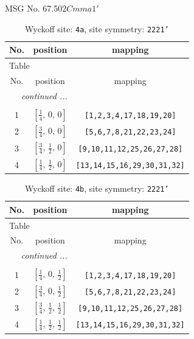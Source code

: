 \documentclass[fleqn,8pt]{jsarticle}
\begin{document}
\setcounter{MaxMatrixCols}{32}

\renewcommand{\tablename}{Table~}
\renewcommand{\figurename}{Figure~}
\begin{center}
\LARGE
MSG No. 67.502\quad$Cmma1'$
\end{center}
\renewcommand{\arraystretch}{1.2}
\begin{longtable}{ccc}
\caption{Wyckoff site: {\tt 4a}, site symmetry: {\tt 2221'}}
 \\
 \hline \hline
No. & position & mapping \\ \hline \endfirsthead

\multicolumn{2}{l}{\tablename\ \thetable{}} \\
 \hline \hline
No. & position & mapping \\ \hline \endhead

 \hline \hline
\multicolumn{2}{r}{\footnotesize\it continued ...} \\ \endfoot

 \hline \hline
\multicolumn{2}{r}{} \\ \endlastfoot

1 & $\left[ \frac{1}{4},\, 0,\, 0 \right]$ & {\tt [1,2,3,4,17,18,19,20]} \\ \hline
2 & $\left[ \frac{3}{4},\, 0,\, 0 \right]$ & {\tt [5,6,7,8,21,22,23,24]} \\ \hline
3 & $\left[ \frac{3}{4},\, \frac{1}{2},\, 0 \right]$ & {\tt [9,10,11,12,25,26,27,28]} \\ \hline
4 & $\left[ \frac{1}{4},\, \frac{1}{2},\, 0 \right]$ & {\tt [13,14,15,16,29,30,31,32]} \\
\end{longtable}
\renewcommand{\arraystretch}{1.2}
\begin{longtable}{ccc}
\caption{Wyckoff site: {\tt 4b}, site symmetry: {\tt 2221'}}
 \\
 \hline \hline
No. & position & mapping \\ \hline \endfirsthead

\multicolumn{2}{l}{\tablename\ \thetable{}} \\
 \hline \hline
No. & position & mapping \\ \hline \endhead

 \hline \hline
\multicolumn{2}{r}{\footnotesize\it continued ...} \\ \endfoot

 \hline \hline
\multicolumn{2}{r}{} \\ \endlastfoot

1 & $\left[ \frac{1}{4},\, 0,\, \frac{1}{2} \right]$ & {\tt [1,2,3,4,17,18,19,20]} \\ \hline
2 & $\left[ \frac{3}{4},\, 0,\, \frac{1}{2} \right]$ & {\tt [5,6,7,8,21,22,23,24]} \\ \hline
3 & $\left[ \frac{3}{4},\, \frac{1}{2},\, \frac{1}{2} \right]$ & {\tt [9,10,11,12,25,26,27,28]} \\ \hline
4 & $\left[ \frac{1}{4},\, \frac{1}{2},\, \frac{1}{2} \right]$ & {\tt [13,14,15,16,29,30,31,32]} \\
\end{longtable}
\end{document}
